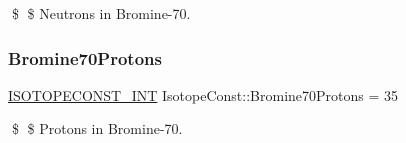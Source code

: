 \$ \$ Neutrons in Bromine-\/70. \mbox{\label{group___isotope_const-_bromine-_br70_ga25d599124974e9d20c0db88dea222dd6}} 
\subsubsection{\texorpdfstring{Bromine70\+Protons}{Bromine70Protons}}
{\footnotesize\ttfamily \mbox{\hyperlink{group___isotope_const-_macros_ga5f18360b3e99483a35c32d789e62621c}{I\+S\+O\+T\+O\+P\+E\+C\+O\+N\+S\+T\+\_\+\+I\+NT}} Isotope\+Const\+::\+Bromine70\+Protons = 35}

\$ \$ Protons in Bromine-\/70. 